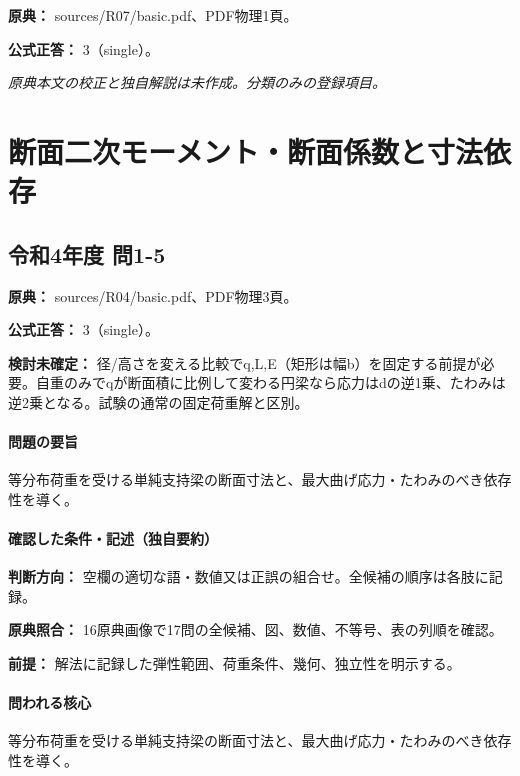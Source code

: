 \noindent\textbf{原典：} sources/R07/basic.pdf、PDF物理1頁。

\textbf{公式正答：} 3（single）。

\par\textit{原典本文の校正と独自解説は未作成。分類のみの登録項目。}

\section{断面二次モーメント・断面係数と寸法依存}

\subsection{令和4年度 問1-5}
\label{q:r04-reg-basic-1-5}

\noindent\textbf{原典：} sources/R04/basic.pdf、PDF物理3頁。

\textbf{公式正答：} 3（single）。

\par\textbf{検討未確定：} 径/高さを変える比較でq,L,E（矩形は幅b）を固定する前提が必要。自重のみでqが断面積に比例して変わる円梁なら応力はdの逆1乗、たわみは逆2乗となる。試験の通常の固定荷重解と区別。

\paragraph{問題の要旨} 等分布荷重を受ける単純支持梁の断面寸法と、最大曲げ応力・たわみのべき依存性を導く。

\paragraph{確認した条件・記述（独自要約）}\mbox{}\par

\noindent\textbf{判断方向：} 空欄の適切な語・数値又は正誤の組合せ。全候補の順序は各肢に記録。\par

\noindent\textbf{原典照合：} 16原典画像で17問の全候補、図、数値、不等号、表の列順を確認。\par

\noindent\textbf{前提：} 解法に記録した弾性範囲、荷重条件、幾何、独立性を明示する。\par

\paragraph{問われる核心} 等分布荷重を受ける単純支持梁の断面寸法と、最大曲げ応力・たわみのべき依存性を導く。

